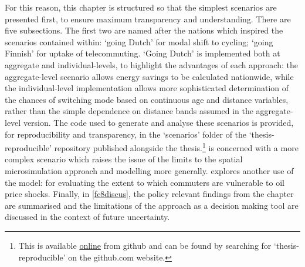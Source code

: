 For this reason, this chapter is structured so that the simplest 
scenarios are presented first, to ensure maximum transparency and
understanding.
There are
five subsections.
The first two are named after the nations which inspired the 
scenarios contained within: `going Dutch' for modal shift to cycling;
`going Finnish' for uptake of telecommuting.
`Going Dutch' is implemented both at aggregate and individual-levels,
to highlight the advantages of each approach: the aggregate-level
scenario allows energy savings to be calculated nationwide, while the
individual-level implementation allows more sophisticated determination
of the chances of switching mode based on continuous age and distance
variables, rather than the simple dependence on distance bands
assumed in the aggregate-level version. The code used to generate and analyse
these scenarios is provided, for reproducibility and transparency, in the
`scenarios' folder of the `thesis-reproducible' repository published alongside
the thesis.\footnote{This is
available
{\color{blue}\href{https://github.com/Robinlovelace/thesis-reproducible}{online}
} from github and can be found by searching for
`thesis-reproducible' on the github.com website.}
 is concerned
with a more complex scenario which raises the issue of the limits to the
spatial microsimulation approach and modelling more generally. 
explores another use of the model: for evaluating the
extent to which commuters are vulnerable to oil price shocks. Finally, in
\cref{fc8discus}, the policy relevant findings from the chapter are summarised
and the limitations of the approach as a decision making
tool are discussed in the context of future uncertainty.

